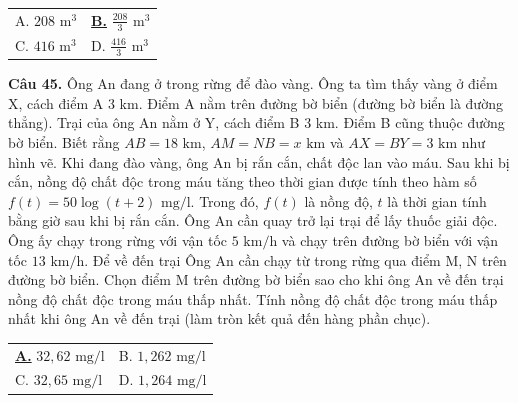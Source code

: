 \documentclass[12pt,a4paper]{article}
\makeatletter
\newcommand{\choiceA}[4]{
    \par\vspace{0.5em}\noindent
    \begin{tabularx}{\textwidth}{@{}X X@{}}
    \underline{\textbf{A.}} #1 & B. #2 \\[1.2em]
    C. #3 & D. #4
    \end{tabularx}
}
\newcommand{\choiceB}[4]{
    \par\vspace{0.5em}\noindent
    \begin{tabularx}{\textwidth}{@{}X X@{}}
    A. #1 & \underline{\textbf{B.}} #2 \\[1.2em]
    C. #3 & D. #4
    \end{tabularx}
}
\makeatother
\begin{document}
\choiceB{$208\text{ m}^3$}{$\frac{208}{3}\text{ m}^3$}{$416\text{ m}^3$}{$\frac{416}{3}\text{ m}^3$}

\textbf{Câu 45.} Ông An đang ở trong rừng để đào vàng. Ông ta tìm thấy vàng ở điểm X, cách điểm A 3 km. Điểm A nằm trên đường bờ biển (đường bờ biển là đường thẳng). Trại của ông An nằm ở Y, cách điểm B 3 km. Điểm B cũng thuộc đường bờ biển. Biết rằng $AB=18\text{ km}$, $AM=NB=x\text{ km}$ và $AX=BY=3\text{ km}$ như hình vẽ. Khi đang đào vàng, ông An bị rắn cắn, chất độc lan vào máu. Sau khi bị cắn, nồng độ chất độc trong máu tăng theo thời gian được tính theo hàm số $f(t)=50\log(t+2)\text{ mg/l}$. Trong đó, $f(t)$ là nồng độ, $t$ là thời gian tính bằng giờ sau khi bị rắn cắn. Ông An cần quay trở lại trại để lấy thuốc giải độc. Ông ấy chạy trong rừng với vận tốc $5\text{ km/h}$ và chạy trên đường bờ biển với vận tốc $13\text{ km/h}$. Để về đến trại Ông An cần chạy từ trong rừng qua điểm M, N trên đường bờ biển. Chọn điểm M trên đường bờ biển sao cho khi ông An về đến trại nồng độ chất độc trong máu thấp nhất. Tính nồng độ chất độc trong máu thấp nhất khi ông An về đến trại (làm tròn kết quả đến hàng phần chục).
\begin{center}
\end{center}
\choiceA{$32,62\text{ mg/l}$}{$1,262\text{ mg/l}$}{$32,65\text{ mg/l}$}{$1,264\text{ mg/l}$}
\end{document}
